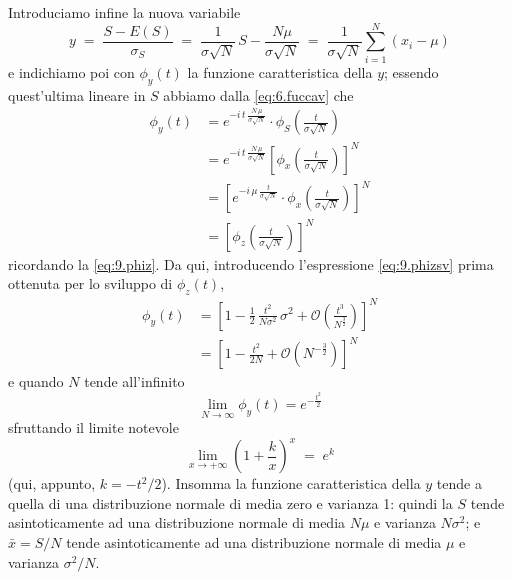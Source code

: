Introduciamo infine la nuova variabile
\begin{equation*}
  y \; = \; \frac{S - E(S)}{\sigma_S} \; = \;
    \frac{1}{\sigma \sqrt{N}} \, S -
    \frac{N \mu}{\sigma \sqrt{N}} \; = \;
    \frac{1}{\sigma \sqrt{N}} \sum_{i=1}^N \left( x_i -
    \mu \right)
\end{equation*}
e indichiamo poi con $\phi_y(t)$ la funzione caratteristica
della $y$; essendo quest'ultima lineare in $S$ abbiamo dalla
\eqref{eq:6.fuccav} che
\begin{align*}
  \phi_y(t) &= e^{- i \, t \, \frac{N \, \mu}{\sigma
    \sqrt{N}}} \cdot \phi_S \left( \frac{t}{\sigma
    \sqrt{N}} \right) \\[1ex]
  &= e^{- i \, t \, \frac{N \, \mu}{\sigma \sqrt{N}}}
    \left[ \phi_x \left( \frac{t}{\sigma \sqrt{N}}
    \right) \right]^N \\[1ex]
  &= \left[ e^{- i \, \mu \, \frac{t}{\sigma \sqrt{N}}}
    \cdot \phi_x \left( \frac{t}{\sigma \sqrt{N}}
    \right) \right]^N \\[1ex]
  &= \left[ \phi_z \left( \frac{t}{\sigma \sqrt{N}}
    \right) \right]^N
\end{align*}
ricordando la \eqref{eq:9.phiz}.  Da qui, introducendo
l'espressione \eqref{eq:9.phizsv} prima ottenuta per lo
sviluppo di $\phi_z(t)$,
\begin{align*}
  \phi_y(t) &= \left[ 1 - \frac{1}{2} \, \frac{t^2}{N
    \sigma^2} \, \sigma^2 + \mathcal{O} \left(
    \frac{t^3}{N^{ \frac{3}{2}}} \right) \right]^N
    \\[1ex]
  &= \left[ 1 - \frac{t^2}{2 N} + \mathcal{O}
    \left( N^{- \frac{3}{2} } \right) \right]^N
\end{align*}
e quando $N$ tende all'infinito
\begin{equation*}
  \lim_{N \to \infty} \phi_y(t) = e^{- \frac{t^2}{2}}
\end{equation*}
sfruttando il limite notevole
\begin{equation} \label{eq:9.linote}
  \lim_{x \to +\infty} \left( 1 + \frac{k}{x}
    \right)^x \; = \; e^k
\end{equation}
(qui, appunto, $k = -t^2/2$).  Insomma la funzione
caratteristica della $y$ tende a quella di una distribuzione
normale di media zero e varianza 1: quindi la $S$ tende
asintoticamente ad una distribuzione normale di media $N
\mu$ e varianza $N \sigma^2$; e $\bar x = S / N$ tende
asintoticamente ad una distribuzione normale di media $\mu$
e varianza $\sigma^2 / N$.

